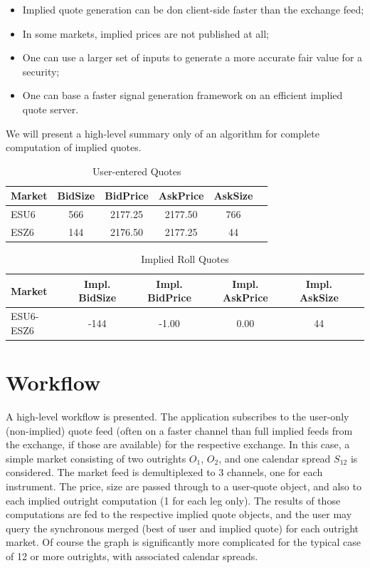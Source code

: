 \documentclass{article}
\begin{document}
\begin{itemize}
\item Implied quote generation can be don client-side faster than the exchange feed;
\item In some markets, implied prices are not published at all;
\item One can use a larger set of inputs to generate a more accurate fair value for a security;
\item One can base a faster signal generation framework on an efficient implied quote server.
\end{itemize}

We will present a high-level summary only of an algorithm for complete computation of implied quotes.

\clearpage
\begin{table}
\centering
\begin{tabular}{|l|c|c|c|c|c|}
\hline
Market & BidSize & BidPrice & AskPrice & AskSize\\
\hline
ESU6 & 566 & 2177.25 & 2177.50 & 766 \\
ESZ6 & 144 & 2176.50 & 2177.25 & 44 \\
\hline
\end{tabular}
\caption{User-entered Quotes}
\label{tab:template}
\end{table}

\begin{table}
\centering
\begin{tabular}{|l|c|c|c|c|c|}
\hline
Market & Impl. BidSize & Impl. BidPrice & Impl. AskPrice & Impl. AskSize\\
\hline
ESU6-ESZ6 & -144 & -1.00   & 0.00  & 44 \\
\hline
\end{tabular}
\caption{Implied Roll Quotes}
\label{tab:template}
\end{table}


\section*{Workflow}
A high-level workflow is presented. The application subscribes to the user-only (non-implied) quote feed (often on a faster channel than full implied feeds from the exchange, if those are available)  for the respective exchange. In this case, a simple market consisting of two outrights $O_1$, $O_2$, and one calendar spread $S_12$ is considered. The market feed is demultiplexed to 3 channels, one for each instrument. The price, size are passed through to a user-quote object, and also to each implied outright computation (1 for each leg only). The results of those computations are fed to the respective implied quote objects, and the user may query the synchronous merged (best of user and implied quote) for each outright market. Of course the graph is significantly more complicated for the typical case of 12 or more outrights, with associated calendar spreads.
\end{document}
